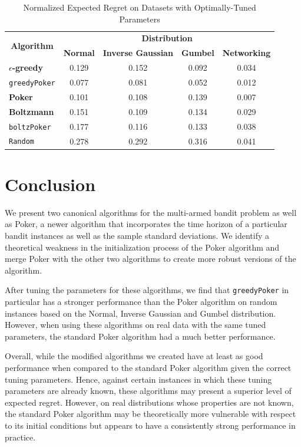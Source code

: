 \documentclass[12pt]{article}
\begin{document}
\begin{table}[htbp]
  \centering
  \caption{Normalized Expected Regret on Datasets with Optimally-Tuned Parameters}
    \begin{tabular}{|c|c|c|c|c|}
    \hline
    \multicolumn{1}{|c|}{\multirow{2}[5]{*}{\textbf{Algorithm}}} & \multicolumn{4}{|c|}{\textbf{Distribution}} \\ \cline{2-5}
    \multicolumn{1}{|c|}{} & \multicolumn{1}{|c|}{\textbf{Normal}} & \multicolumn{1}{|c|}{\textbf{Inverse Gaussian}} & \multicolumn{1}{|c|}{\textbf{Gumbel}} & \multicolumn{1}{|c|}{\textbf{Networking}} \\ \hline
    \multicolumn{1}{|l|}{\textbf{$\epsilon$-greedy}} & 0.129 & 0.152 & 0.092 & 0.034 \\  \hline
    \multicolumn{1}{|l|}{\texttt{greedyPoker}} & 0.077 & 0.081 & 0.052 & 0.012   \\ \hline
    \multicolumn{1}{|l|}{\textbf{Poker}} & 0.101 & 0.108 & 0.139  & 0.007\\ \hline
    \multicolumn{1}{|l|}{\textbf{Boltzmann}} & 0.151 & 0.109 & 0.134 & 0.029  \\ \hline
    \multicolumn{1}{|l|}{\texttt{boltzPoker}} & 0.177 & 0.116 & 0.133  & 0.038 \\ \hline
    \multicolumn{1}{|l|}{\texttt{Random}} & 0.278 & 0.292 & 0.316 & 0.041  \\ \hline
    \end{tabular}%
  \label{tab:tuned_results}%
\end{table}%


\section{Conclusion}

We present two canonical algorithms for the multi-armed bandit problem as well as Poker, a newer algorithm that incorporates the time horizon of a particular bandit instances as well as the sample standard deviations. We identify a theoretical weakness in the initialization process of the Poker algorithm and merge Poker with the other two algorithms to create more robust versions of the algorithm.

After tuning the parameters for these algorithms, we find that \texttt{greedyPoker} in particular has a stronger performance than the Poker algorithm on random instances based on the Normal, Inverse Gaussian and Gumbel distribution. However, when using these algorithms on real data with the same tuned parameters, the standard Poker algorithm had a much better performance.

Overall, while the modified algorithms we created have at least as good performance when compared to the standard Poker algorithm given the correct tuning parameters. Hence, against certain instances in which these tuning parameters are already known, these algorithms may present a superior level of expected regret. However, on real distributions whose properties are not known, the standard Poker algorithm may be theoretically more vulnerable with respect to its initial conditions but appears to have a consistently strong performance in practice.



\end{document}
